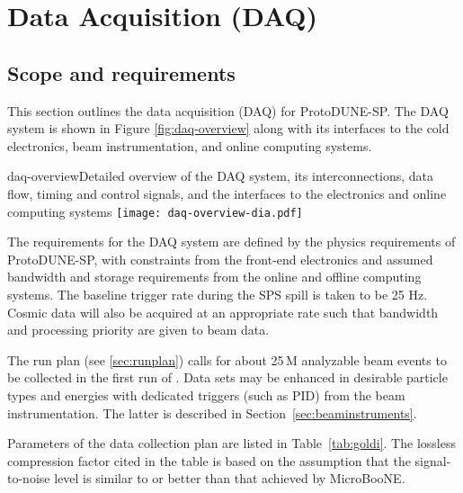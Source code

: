 \section{Data Acquisition (DAQ)} 
\label{sec:daq}

\subsection{Scope and requirements}

This section outlines the data acquisition (DAQ) for ProtoDUNE-SP.
The DAQ system is shown in Figure \ref{fig:daq-overview} along with its
interfaces to the cold electronics, beam instrumentation, and online
computing systems.


\begin{cdrfigure}{daq-overview}{Detailed overview of the
DAQ system, its interconnections, data flow, timing and control signals,
and the interfaces to the electronics and online computing systems}
        \texttt{[image: daq-overview-dia.pdf]}
\end{cdrfigure}

The requirements for the DAQ system are defined
by the physics requirements of  ProtoDUNE-SP, with constraints from the
front-end electronics and assumed bandwidth and storage requirements
from the online and offline computing systems.  The baseline trigger
rate during the SPS spill is taken to be 25 Hz.  Cosmic data will also
be acquired at an appropriate rate such that bandwidth and processing priority are given 
to beam data.

The run plan (see \ref{sec:runplan}) calls for about 25\,M analyzable beam events
to be collected in the first run of \pdsp. Data sets may be enhanced  in desirable particle types and energies
with dedicated triggers (such as PID)  from the beam instrumentation. The latter is described in Section~\ref{sec:beaminstruments}.

Parameters of the data collection plan are listed in Table~\ref{tab:goldi}. The lossless 
compression factor cited
in the table is based on the assumption that the signal-to-noise level 
is similar to or better than that achieved by MicroBooNE. 


